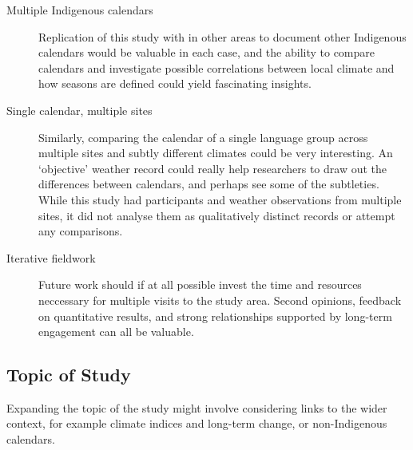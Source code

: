 \begin{description}
\item[Multiple Indigenous calendars]
    Replication of this study with in other areas to document other Indigenous calendars would be
    valuable in each case, and the ability to compare calendars and investigate
    possible correlations between local climate and how seasons are defined
    could yield fascinating insights.

\item[Single calendar, multiple sites]
    Similarly, comparing the calendar of a single language group across
    multiple sites and subtly different climates could be very interesting.
    An `objective' weather record could really help researchers to draw out
    the differences between calendars, and perhaps see some of the subtleties.
    While this study had participants and weather observations from multiple
    sites, it did not analyse them as qualitatively distinct records or
    attempt any comparisons.

\item[Iterative fieldwork]
    Future work should if at all possible invest the time and resources
    neccessary for multiple visits to the study area.  Second opinions,
    feedback on quantitative results, and strong relationships supported by
    long-term engagement can all be valuable.
\end{description}

\subsection{Topic of Study}
Expanding the topic of the study might involve considering links to the wider
context, for example climate indices and long-term change, or non-Indigenous
calendars.

